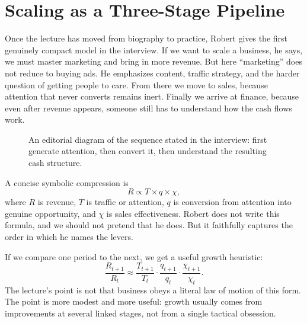 \section{Scaling as a Three-Stage Pipeline}

Once the lecture has moved from biography to practice, Robert gives the first genuinely compact model in the interview. If we want to scale a business, he says, we must master marketing and bring in more revenue. But here ``marketing'' does not reduce to buying ads. He emphasizes content, traffic strategy, and the harder question of getting people to care. From there we move to sales, because attention that never converts remains inert. Finally we arrive at finance, because even after revenue appears, someone still has to understand how the cash flows work.

\begin{figure}[h]
\centering
{}
\caption{An editorial diagram of the sequence stated in the interview: first generate attention, then convert it, then understand the resulting cash structure.}
\end{figure}

A concise symbolic compression is
\begin{equation}
R \propto T \times q \times \chi,
\end{equation}
where \(R\) is revenue, \(T\) is traffic or attention, \(q\) is conversion from attention into genuine opportunity, and \(\chi\) is sales effectiveness. Robert does not write this formula, and we should not pretend that he does. But it faithfully captures the order in which he names the levers.

If we compare one period to the next, we get a useful growth heuristic:
\begin{equation}
\frac{R_{t+1}}{R_t}
\approx
\frac{T_{t+1}}{T_t}
\cdot
\frac{q_{t+1}}{q_t}
\cdot
\frac{\chi_{t+1}}{\chi_t}.
\end{equation}
The lecture's point is not that business obeys a literal law of motion of this form. The point is more modest and more useful: growth usually comes from improvements at several linked stages, not from a single tactical obsession.

